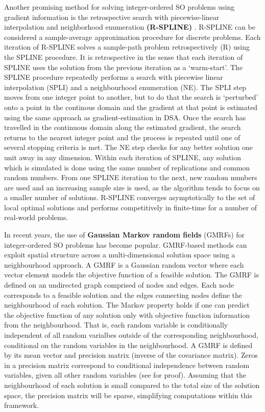 \documentclass[12pt,a4paper]{article}
\begin{document}
Another promising method for solving integer-ordered SO problems using gradient information is the retrospective search with piecewise-linear interpolation and neighborhood enumeration \textbf{(R-SPLINE)} \citep{wang2013integer}. R-SPLINE can be considered a sample-average approximation procedure for discrete problems. Each iteration of R-SPLINE solves a sample-path problem retrospectively (R) using the SPLINE procedure. It is retrospective in the sense that each iteration of SPLINE uses the solution from the previous iteration as a `warm-start'. The SPLINE procedure repeatedly performs a search with piecewise linear interpolation (SPLI) and a neighbourhood enumeration (NE). The SPLI step moves from one integer point to another, but to do that the search is `perturbed' onto a point in the continous domain and the gradient at that point is estimated using the same approach as gradient-estimation in DSA. Once the search has travelled in the continuous domain along the estimated gradient, the search returns to the nearest integer point and the process is repeated until one of several stopping criteria is met. The NE step checks for any better solution one unit away in any dimension. Within each iteration of SPLINE, any solution which is simulated is done using the same number of replications and common random numbers. From one SPLINE iteration to the next, new random numbers are used and an increasing sample size is used, as the algorithm tends to focus on a smaller number of solutions. R-SPLINE converges asymptotically to the set of local optimal solutions and performs competitively in finite-time for a number of real-world problems. 

In recent years, the use of \textbf{Gaussian Markov random fields} (GMRFs) \citep{l2019gaussian} for integer-ordered SO problems has become popular. GMRF-based methods can exploit spatial structure across a multi-dimensional solution space using a neighbourhood approach. A GMRF is a Gaussian random vector where each vector element models the objective function of a feasible solution. The GMRF is defined on an undirected graph comprised of nodes and edges. Each node corresponds to a feasible solution and the edges connecting nodes define the neighbourhood of each  solution. The Markov property holds if one can predict the objective function of any solution only with objective function information from the neighbourhood. That is, each random variable is conditionally independent of all random varialbes outside of the corresponding neighbourhood, conditional on the random variables in the neighbourhood. A GMRF is defined by its mean vector and precision matrix (inverse of the covariance matrix). Zeros in a precision matrix correspond to conditional independence between random variables, given all other random variables (see \cite{rue2005gaussian} for proof). Assuming that the neighbourhood of each solution is small compared to the total size of the solution space, the precision matrix will be sparse, simplifying computations within this framework. 
\end{document}
